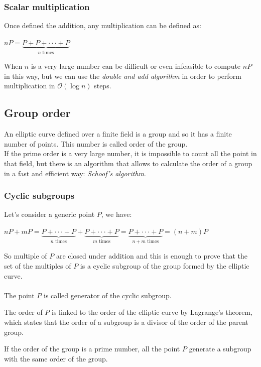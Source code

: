 \subsubsection{Scalar multiplication}
Once defined the addition, any multiplication can be defined as:
\begin{center} 
	$ nP=\underbrace{
		P+P+\cdot \cdot \cdot+P
	}_{n\text{ times}}$
\end{center}
When $n$ is a very large number can be difficult or even infeasible to compute $nP$ in this way, but we can use the \textit{double and add algorithm} in order to perform multiplication in $\mathcal{O}(\log{}n)$ steps.

\subsection{Group order}
An elliptic curve defined over a finite field is a group and so it has a finite number of points. This number is called order of the group.\\
If the prime order is a very large number, it is impossible to count all the point in that field, but there is an algorithm that allows to calculate the order of a group in a fast and efficient way: \textit{Schoof's algorithm}.

\subsubsection{Cyclic subgroups}
Let's consider a generic point $P$, we have:
\begin{center} 
	$ nP+mP=\underbrace{
		P+\cdot \cdot \cdot+P
	}_{n\text{ times}}+
		\underbrace{
		P+\cdot \cdot \cdot+P
	}_{m\text{ times}}=
	\underbrace{
		P+\cdot \cdot \cdot+P
	}_{n+m\text{ times}} = 
	(n+m)P$
\end{center}
So multiple of $P$ are closed under addition and this is enough to prove that the set of the multiples of $P$ is a cyclic subgroup of the group formed by the elliptic curve.
\\ \\
The point $P$ is called generator of the cyclic subgroup.

\begin{remark}
	The order of $P$ is linked to the order of the elliptic curve by Lagrange's theorem, which states that the order of a subgroup is a divisor of the order of the parent group.
\end{remark}

\begin{remark}
	If the order of the group is a prime number, all the point $P$ generate a subgroup with the same order of the group.
\end{remark}


